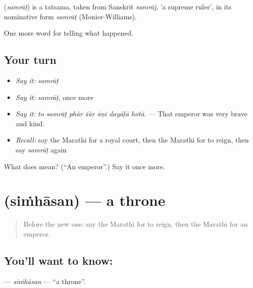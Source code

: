 \begin{cousinweb}
\textbf{} (\emph{samrāṭ}) is a tatsama, taken from Sanskrit \emph{samrāj}, 'a supreme ruler', in its nominative form \emph{samrāṭ} (Monier-Williams).
\end{cousinweb}

\begin{grammarlens}[title={What you've built}]
One more word for telling what happened.
\end{grammarlens}

\subsection*{Your turn}
\begin{itemize}
\raggedright
  \item \emph{Say it:} \emph{samrāṭ}
  \item \emph{Say it:} \emph{samrāṭ}, once more
  \item \emph{Say it:} \emph{to samrāṭ phār śūr āṇi dayāḷū hotā.} — That emperor was very brave and kind.
  \item \emph{Recall:} say the Marathi for a royal court, then the Marathi for to reign, then say \emph{samrāṭ} again
\end{itemize}

\begin{tcolorbox}[breakable,colback=teal!4,colframe=teal!35!black,title={Before you move on}]
What does  mean? (\textquotedblleft{}An emperor\textquotedblright{}.) Say it once more.
\end{tcolorbox}
\section[\texorpdfstring{\mr{सिंहासन} (siṁhāsan)}{सिंहासन (siṁhāsan)}]{ (siṁhāsan) — a throne}

\label{lesson:MR-C326-simhasan}



\begin{quote}
Before the new one: say the Marathi for to reign, then the Marathi for an emperor.
\end{quote}

\subsection*{You'll want to know: }
\textbf{} — \emph{siṁhāsan} — \textquotedblleft{}a throne\textquotedblright{}.


